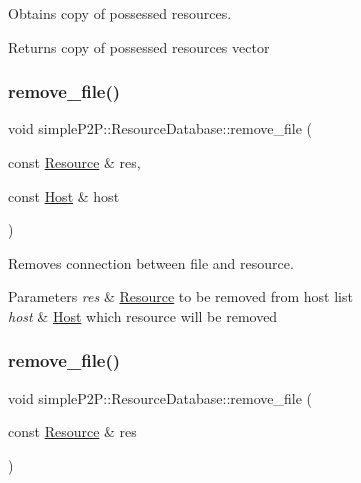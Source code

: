 Obtains copy of possessed resources. 

\begin{DoxyReturn}{Returns}
copy of possessed resources vector 
\end{DoxyReturn}
\mbox{\label{classsimpleP2P_1_1ResourceDatabase_a3ea481ae3b35f9c93e55595a38d8bec4}} 
\subsubsection{\texorpdfstring{remove\+\_\+file()}{remove\_file()}\hspace{0.1cm}{\footnotesize\ttfamily [1/2]}}
{\footnotesize\ttfamily void simple\+P2\+P\+::\+Resource\+Database\+::remove\+\_\+file (\begin{DoxyParamCaption}\item[{const \hyperlink{classsimpleP2P_1_1Resource}{Resource} \&}]{res,  }\item[{const \hyperlink{classsimpleP2P_1_1Host}{Host} \&}]{host }\end{DoxyParamCaption})}



Removes connection between file and resource. 


\begin{DoxyParams}{Parameters}
{\em res} & \hyperlink{classsimpleP2P_1_1Resource}{Resource} to be removed from host list \\
\hline
{\em host} & \hyperlink{classsimpleP2P_1_1Host}{Host} which resource will be removed \\
\hline
\end{DoxyParams}
\mbox{\label{classsimpleP2P_1_1ResourceDatabase_a995998d524895ed8227fa045b8b64c01}} 
\subsubsection{\texorpdfstring{remove\+\_\+file()}{remove\_file()}\hspace{0.1cm}{\footnotesize\ttfamily [2/2]}}
{\footnotesize\ttfamily void simple\+P2\+P\+::\+Resource\+Database\+::remove\+\_\+file (\begin{DoxyParamCaption}\item[{const \hyperlink{classsimpleP2P_1_1Resource}{Resource} \&}]{res }\end{DoxyParamCaption})}



